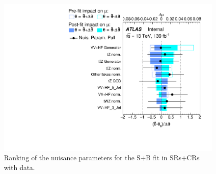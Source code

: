 \begin{figure}[htbp]
	\centering
	\includegraphics[width=.9\textwidth]{Chapters/CH8/figures/SPLUSB_CRSR_DL1rc_unblind/Ranking}
	\caption{Ranking of the nuisance parameters for the S+B \tZc fit in SRs+CRs with data.}%
	\label{fig:stat:tzc:splusb:crsr:ranking_unb}
\end{figure}

\FloatBarrier
\clearpage
\begin{table}[]
	\centering
	\tiny
	
	\caption{Pre-fit event yields in the S+B \tZc fit in SRs+CRs with data. \TabErrStatSys} 
	\label{tab:stat:tzc:splusb:crsr:yields:prefit_unb}
\end{table} 

\begin{table}[]
	\centering
	\tiny
	
	\caption{Post-fit event yields in the S+B\tZc fit in SRs+CRs with data. \TabErrStatSys} 
	\label{tab:stat:tzc:splusb:crsr:yields:postfit_unb}
\end{table} 
\clearpage
\FloatBarrier

